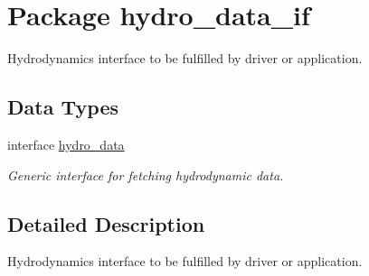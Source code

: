 \hypertarget{a00034}{
\section{Package hydro\_\-data\_\-if}
\label{a00034}
}
Hydrodynamics interface to be fulfilled by driver or application.  


\subsection*{Data Types}
\begin{CompactItemize}
\item 
interface \hyperlink{a00002}{hydro\_\-data}
\begin{CompactList}\small\item\em Generic interface for fetching hydrodynamic data. \item\end{CompactList}\end{CompactItemize}


\subsection{Detailed Description}
Hydrodynamics interface to be fulfilled by driver or application. 

